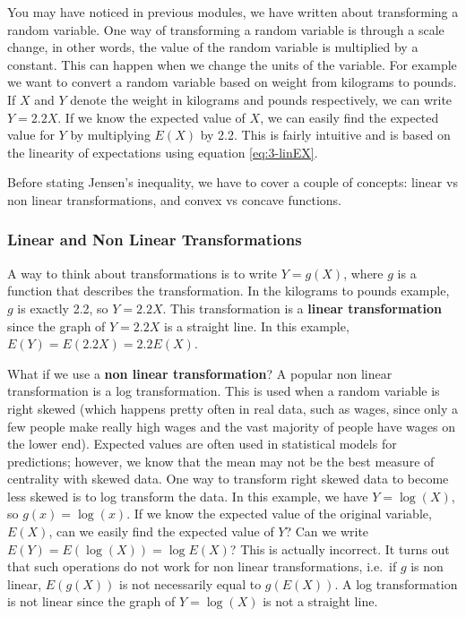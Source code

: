 \documentclass[
]{book}
\begin{document}
You may have noticed in previous modules, we have written about transforming a random variable. One way of transforming a random variable is through a scale change, in other words, the value of the random variable is multiplied by a constant. This can happen when we change the units of the variable. For example we want to convert a random variable based on weight from kilograms to pounds. If \(X\) and \(Y\) denote the weight in kilograms and pounds respectively, we can write \(Y = 2.2X\). If we know the expected value of \(X\), we can easily find the expected value for \(Y\) by multiplying \(E(X)\) by 2.2. This is fairly intuitive and is based on the linearity of expectations using equation \eqref{eq:3-linEX}.

Before stating Jensen's inequality, we have to cover a couple of concepts: linear vs non linear transformations, and convex vs concave functions.

\hypertarget{linnonlin}{%
\subsubsection{Linear and Non Linear Transformations}\label{linnonlin}}

A way to think about transformations is to write \(Y = g(X)\), where \(g\) is a function that describes the transformation. In the kilograms to pounds example, \(g\) is exactly 2.2, so \(Y = 2.2X\). This transformation is a \textbf{linear transformation} since the graph of \(Y = 2.2X\) is a straight line. In this example, \(E(Y) = E(2.2X) = 2.2E(X)\).

What if we use a \textbf{non linear transformation}? A popular non linear transformation is a log transformation. This is used when a random variable is right skewed (which happens pretty often in real data, such as wages, since only a few people make really high wages and the vast majority of people have wages on the lower end). Expected values are often used in statistical models for predictions; however, we know that the mean may not be the best measure of centrality with skewed data. One way to transform right skewed data to become less skewed is to log transform the data. In this example, we have \(Y = \log(X)\), so \(g(x) = \log(x)\). If we know the expected value of the original variable, \(E(X)\), can we easily find the expected value of \(Y\)? Can we write \(E(Y) = E(\log(X)) = \log E(X)\)? This is actually incorrect. It turns out that such operations do not work for non linear transformations, i.e.~if \(g\) is non linear, \(E(g(X))\) is not necessarily equal to \(g(E(X))\). A log transformation is not linear since the graph of \(Y = \log(X)\) is not a straight line.
\end{document}
